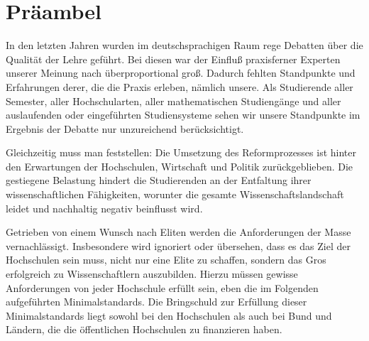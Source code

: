 \section*{Präambel}

In den letzten Jahren wurden im deutschsprachigen Raum rege Debatten über die Qualität der Lehre geführt. Bei diesen war der Einfluß praxisferner Experten unserer Meinung nach überproportional groß. Dadurch fehlten Standpunkte und Erfahrungen derer, die die Praxis erleben, nämlich unsere. Als Studierende aller Semester, aller Hochschularten, aller mathematischen Studiengänge und aller auslaufenden oder eingeführten Studiensysteme sehen wir unsere Standpunkte im Ergebnis der Debatte nur unzureichend berücksichtigt.

Gleichzeitig muss man feststellen: Die Umsetzung des Reformprozesses ist hinter den Erwartungen der Hochschulen, Wirtschaft und Politik zurückgeblieben. Die gestiegene Belastung hindert die Studierenden an der Entfaltung ihrer wissenschaftlichen Fähigkeiten, worunter die gesamte Wissenschaftslandschaft leidet und nachhaltig negativ beinflusst wird.

Getrieben von einem Wunsch nach Eliten werden die Anforderungen der Masse vernachlässigt. Insbesondere wird ignoriert oder übersehen, dass es das Ziel der Hochschulen sein muss, nicht nur eine Elite zu schaffen, sondern das Gros erfolgreich zu Wissenschaftlern auszubilden. Hierzu müssen gewisse Anforderungen von jeder Hochschule erfüllt sein, eben die im Folgenden aufgeführten Minimalstandards. Die Bringschuld zur Erfüllung dieser Minimalstandards liegt sowohl bei den Hochschulen als auch bei Bund und Ländern, die die öffentlichen Hochschulen zu finanzieren haben.
